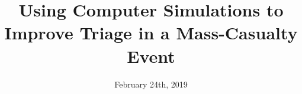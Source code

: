 \documentclass{beamer}
\begin{document}
\newcommand{\clg}{\mathcal{G}}
\newcommand{\clb}{\mathcal{B}}
\newcommand{\cls}{\mathcal{S}}
\newcommand{\clc}{\mathcal{C}}
\newcommand{\clj}{\mathcal{J}}
\newcommand{\clm}{\mathcal{M}}
\newcommand{\clx}{\mathcal{X}}
\newcommand{\cld}{\mathcal{D}}
\newcommand{\cle}{\mathcal{E}}
\newcommand{\clv}{\mathcal{V}}
\newcommand{\clu}{\mathcal{U}}
\newcommand{\clr}{\mathcal{R}}
\newcommand{\clt}{\mathcal{T}}
\newcommand{\cll}{\mathcal{L}}
\newcommand{\clz}{\mathcal{Z}}
\newcommand{\clq}{\mathcal{Q}}

\newcommand{\cli}{\mathcal{I}}
\newcommand{\clp}{\mathcal{P}}
\newcommand{\cla}{\mathcal{A}}
\newcommand{\clf}{\mathcal{F}}
\newcommand{\clh}{\mathcal{H}}
\newcommand{\clo}{\mathcal{O}}
\newcommand{\N}{\mathbb{N}}
\newcommand{\Q}{\mathbb{Q}}
\newcommand{\bfx}{{\boldsymbol{x}}}
\newcommand{\bfa}{{\boldsymbol{a}}}
\newcommand{\bfh}{{\boldsymbol{h}}}
\newcommand{\bfs}{{\boldsymbol{s}}}
\newcommand{\bfm}{{\boldsymbol{m}}}
\newcommand{\bff}{{\boldsymbol{f}}}
\newcommand{\bfb}{{\boldsymbol{b}}}
\newcommand{\bfw}{{\boldsymbol{w}}}
\newcommand{\bfz}{{\boldsymbol{z}}}
\newcommand{\bfu}{{\boldsymbol{u}}}
\newcommand{\bfell}{{\boldsymbol{\ell}}}
\newcommand{\bfn}{{\boldsymbol{n}}}
\newcommand{\bfd}{{\boldsymbol{d}}}
\newcommand{\bfbeta}{{\boldsymbol{\beta}}}
\newcommand{\bfzeta}{{\boldsymbol{\zeta}}}
\newcommand{\bfnu}{{\boldsymbol{\nu}}}
\newcommand{\bfvarphi}{{\boldsymbol{\varphi}}}

\newcommand{\curvz}{{\bf \mathpzc{z}}}
\newcommand{\curvx}{{\bf \mathpzc{x}}}
\newcommand{\curvi}{{\bf \mathpzc{i}}}
\newcommand{\curvs}{{\bf \mathpzc{s}}}
\newcommand{\blip}{\mathbb{B}_1}

\newcommand{\BM}{\mbox{BM}}

\newcommand{\tac}{\mbox{\scriptsize{AC}}}

\title[Triage]{Using Computer Simulations to Improve Triage in a Mass-Casualty Event} %

\date{February 24th, 2019} %
\end{document}
